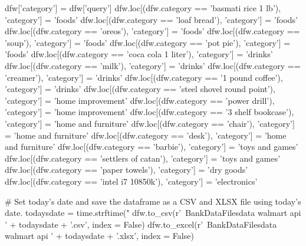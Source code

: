 \begin{python}
dfw['category'] = dfw['query']
dfw.loc[(dfw.category == 'basmati rice 1 lb'), 'category'] = 'foods'
dfw.loc[(dfw.category == 'loaf bread'), 'category'] = 'foods'
dfw.loc[(dfw.category == 'oreos'), 'category'] = 'foods'
dfw.loc[(dfw.category == 'soup'), 'category'] = 'foods'
dfw.loc[(dfw.category == 'pot pie'), 'category'] = 'foods'
dfw.loc[(dfw.category == 'coca cola 1 liter'), 'category'] = 'drinks'
dfw.loc[(dfw.category == 'milk'), 'category'] = 'drinks'
dfw.loc[(dfw.category == 'creamer'), 'category'] = 'drinks'
dfw.loc[(dfw.category == '1 pound coffee'), 'category'] = 'drinks'
dfw.loc[(dfw.category == 'steel shovel round point'), 'category'] = 'home improvement'
dfw.loc[(dfw.category == 'power drill'), 'category'] = 'home improvement'
dfw.loc[(dfw.category == '3 shelf bookcase'), 'category'] = 'home and furniture'
dfw.loc[(dfw.category == 'chair'), 'category'] = 'home and furniture'
dfw.loc[(dfw.category == 'desk'), 'category'] = 'home and furniture'
dfw.loc[(dfw.category == 'barbie'), 'category'] = 'toys and games'
dfw.loc[(dfw.category == 'settlers of catan'), 'category'] = 'toys and games'
dfw.loc[(dfw.category == 'paper towels'), 'category'] = 'dry goods'
dfw.loc[(dfw.category == 'intel i7 10850k'), 'category'] = 'electronics'

# Set today's date and save the dataframe as a CSV and XLSX file using today's date.
todaysdate = time.strftime("%
dfw.to_csv(r'~\World Bank\Data\Walmart Data\CSV Files\PPP data walmart api ' + 
           todaysdate + '.csv', index = False)
dfw.to_excel(r'~\World Bank\Data\Walmart Data\Excel Files\PPP data walmart api ' + 
             todaysdate + '.xlsx', index = False)
\end{python}


